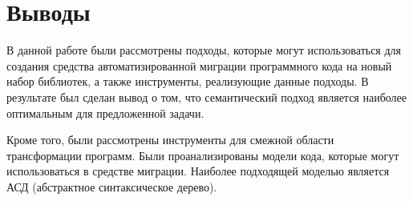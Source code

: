 \section*{Выводы}
В данной работе были рассмотрены подходы, которые могут использоваться для создания средства автоматизированной миграции программного кода на новый набор библиотек, а также инструменты, реализующие данные подходы. В результате был сделан вывод о том, что семантический подход является наиболее оптимальным для предложенной задачи.

Кроме того, были рассмотрены инструменты для смежной области трансформации программ. Были проанализированы модели кода, которые могут использоваться в средстве миграции. Наиболее подходящей моделью является АСД (абстрактное синтаксическое дерево).